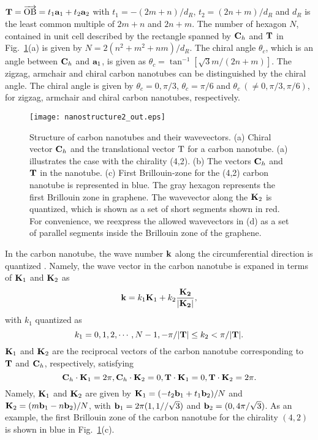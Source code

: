 \documentclass[journal=nalefd,manuscript=article,layout=twocolumn]{achemso}
\begin{document}
$
{\bf T}=\overrightarrow{\rm OB}=t_1{\bf a}_1+t_2{\bf a}_2
$ with $t_1=-(2m+n)/d_R$, $t_2=(2n+m)/d_R$ 
and $d_R$ is the least common multiple of $2m+n$ and $2n+m$. 
The number of hexagon $N$, contained in unit cell described by the rectangle spanned by 
${\bf C}_h$ and ${\bf T}$
in Fig.\ \ref{fg:nanostructure}(a) is given by $N=2(n^2+m^2+nm)/d_R$. 
The chiral angle $\theta _c$, which is an angle between ${\bf C}_h$ and ${\bf a}_1$, is given as 
$\theta_c=\tan^{-1}[\sqrt{3}m/(2n+m)]$. The zigzag, armchair and chiral carbon nanotubes 
can be distinguished by the chiral angle. The chiral angle is given by $\theta_c=0, \pi/3$, 
$\theta_c=\pi/6$ and $\theta_c\ (\neq 0, \pi/3, \pi/6)$, for zigzag, armchair and chiral 
carbon nanotubes, respectively. 
\begin{figure}[htb]
\texttt{[image: nanostructure2\_out.eps]} 
  \caption{Structure of carbon nanotubes and their wavevectors.  
  (a) Chiral vector ${\bf C}_h$ and the translational vector ${\rm T}$ for 
  a carbon nanotube. (a) illustrates the case with the chirality (4,2). 
(b) The vectors ${\bf C}_h$ and ${\bf T}$ in the nanotube.  (c) First Brillouin-zone for the (4,2) carbon nanotube is represented in blue. 
  The gray hexagon represents the first Brillouin zone in graphene. The wavevector along the ${\bf K}_2$ 
  is quantized, which is shown as a set of short segments shown in red. For convenience, we reexpress the
  allowed wavevectors in (d) as a set of parallel segments inside the Brillouin zone of the graphene.}
  \label{fg:nanostructure}
\end{figure}

In the carbon nanotube, the wave number ${\bf k}$ along the circumferential direction 
is quantized \cite{Saito_1998,Dresselhaus_1996,Ajiki_1993}. 
Namely, the wave vector in the carbon nanotube is expaned in terms of ${\bf K}_1$ and ${\bf K}_2$ as
\begin{equation}
{\bf k}=k_1{\bf K}_1+ k_2 \frac{\bf K_2}{|\bf K_2|}, 
\label{eq:wavevector}
\end{equation}
with $k_1$ quantized as
\begin{equation}
k_1=0,1,2,\cdots ,N-1, -\pi/|{\bf T}|\leq k_2<\pi/|{\bf T}|. 
\end{equation}
${\bf K}_1$ and ${\bf K}_2$ are the reciprocal vectors of the carbon nanotube 
corresponding to ${\bf T}$ and ${\bf C}_h$, respectively,
satisfying
\begin{equation}
{\bf C}_h\cdot{\bf K}_1=2\pi, {\bf C}_h\cdot{\bf K}_2=0, {\bf T}\cdot{\bf K}_1=0, {\bf T}\cdot{\bf K}_2=2\pi.
\end{equation}
Namely,  
${\bf K}_1$ and ${\bf K}_2$ are given by ${\bf K}_1=(-t_2{\bf b}_1+t_1{\bf b}_2)/N$ and 
${\bf K}_2=(m{\bf b}_1-n{\bf b}_2)/N$, with ${\bf b}_1=2\pi(1,1//{\sqrt 3})$ and 
${\bf b}_2=(0,4\pi/{\sqrt 3})$. 
As an example, the first Brillouin zone of the carbon nanotube for the chirality $(4,2)$ is shown
in blue
in Fig.\ \ref{fg:nanostructure}(c). 
\end{document}

